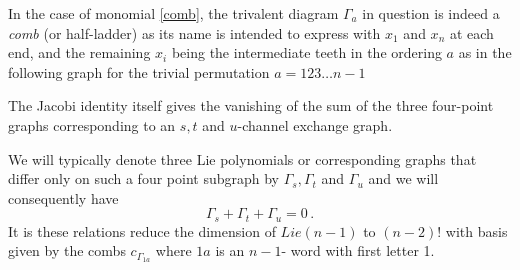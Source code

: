 \documentclass[11pt]{article}
\newcommand{\1}{{\rm 1\hskip-0.25em I}}
\begin{document}
 In the case of monomial \eqref{comb}, the trivalent diagram $\Gamma_a$ in question is indeed a \emph{comb} (or half-ladder) as its name is intended to express with $x_1$ and $x_n$ at each end, and the remaining $x_i$ being the intermediate teeth in the ordering $a$ as in the following graph %
  for the trivial permutation $a=123\ldots n-1$

\begin{center}
\begin{adjustbox}{width=.5\textwidth,center}%
\end{adjustbox}
\end{center}  
  

  The Jacobi identity itself gives the vanishing of the sum of the three four-point graphs corresponding to an $s, t$ and $u$-channel exchange graph.  
  
  \begin{center}
\end{center}
We will typically denote three Lie polynomials or corresponding graphs that differ only on such a four point subgraph by $\Gamma_s, \Gamma_t$ and $\Gamma_u$ and  we will consequently have
\begin{equation}
\Gamma_s+\Gamma_t+\Gamma_u=0\, .
\end{equation}
It is these relations reduce the dimension of $Lie(n-1)$ to $(n-2)!$ with basis given by the combs $c_{\Gamma_{1a}}$ where $1a$ is an $n-1$- word with first letter 1.   
\end{document}
